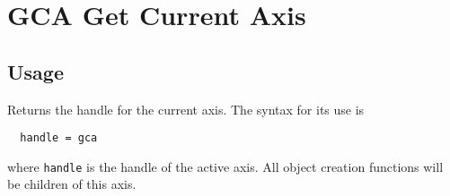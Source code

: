 \section{GCA Get Current Axis}

\subsection{Usage}

Returns the handle for the current axis.  The syntax for its use
is
\begin{verbatim}
  handle = gca
\end{verbatim}
where \verb|handle| is the handle of the active axis.  All object
creation functions will be children of this axis.
